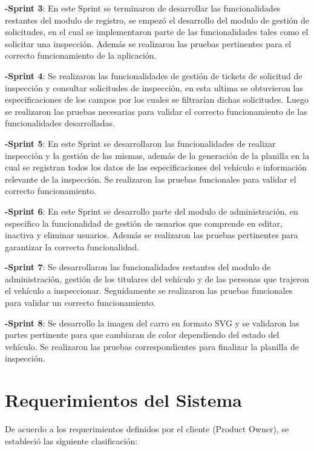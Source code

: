 \textbf{-Sprint 3}: En este Sprint se terminaron de desarrollar las funcionalidades restantes del modulo de registro, se empezó el desarrollo del modulo de gestión de solicitudes, en el cual se implementaron parte de las funcionalidades tales como el solicitar una inspección. Además se realizaron las pruebas pertinentes para el correcto funcionamiento de la aplicación.

\textbf{-Sprint 4}: Se realizaron las funcionalidades de gestión de tickets de solicitud de inspección y consultar solicitudes de inspección, en esta ultima se obtuvieron las especificaciones de los campos por los cuales se filtrarían dichas solicitudes. Luego se realizaron las pruebas necesarias para validar el correcto funcionamiento de las funcionalidades desarrolladas.

\textbf{-Sprint 5}: En este Sprint se desarrollaron las funcionalidades de realizar inspección y la gestión de las mismas, además de la generación de la planilla en la cual se registran todos los datos de las especificaciones del vehículo e información relevante de la inspección. Se realizaron las pruebas funcionales para validar el correcto funcionamiento.

\textbf{-Sprint 6}: En este Sprint se desarrollo parte del modulo de administración, en especifico la funcionalidad de gestión de usuarios que comprende en editar, inactiva y eliminar usuarios. Además se realizaron las pruebas pertinentes para garantizar la correcta funcionalidad.

\textbf{-Sprint 7}: Se desarrollaron las funcionalidades restantes del modulo de administración, gestión de los titulares del vehículo y de las personas que trajeron el vehículo a inspeccionar. Seguidamente se realizaron las pruebas funcionales para validar un correcto funcionamiento.

\textbf{-Sprint 8}: Se desarrollo la imagen del carro en formato SVG y se validaron las partes pertinente para que cambiaran de color dependiendo del estado del vehículo. Se realizaron las pruebas correspondientes para finalizar la planilla de inspección.

\setlength{\parskip}{0mm}


\section{Requerimientos del Sistema } 
\setlength{\parskip}{5mm}
	De acuerdo a los requerimientos definidos por el cliente (Product Owner), se estableció las siguiente clasificación:

